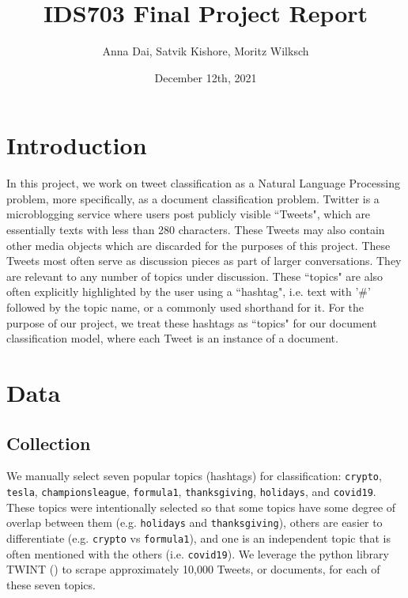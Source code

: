 \documentclass[11pt]{article}
\title{\vspace{-1.5cm}IDS703 Final Project Report}
\author{Anna Dai, Satvik Kishore, Moritz Wilksch}
\date{December 12th, 2021}
\begin{document}
\maketitle

\section{Introduction}

In this project, we work on tweet classification as a Natural Language Processing problem, more specifically, as a document classification problem. Twitter is a microblogging service where users post publicly visible ``Tweets", which are essentially texts with less than 280 characters. These Tweets may also contain other media objects which are discarded for the purposes of this project. These Tweets most often serve as discussion pieces as part of larger conversations. They are relevant to any number of topics under discussion. These ``topics" are also often explicitly highlighted by the user using a ``hashtag", i.e. text with '\#' followed by the topic name, or a commonly used shorthand for it. For the purpose of our project, we treat these hashtags as ``topics" for our document classification model, where each Tweet is an instance of a document.

\section{Data}

\subsection{Collection}
We manually select seven popular topics (hashtags) for classification: \texttt{crypto}, \texttt{tesla}, \texttt{championsleague}, \texttt{formula1}, \texttt{thanksgiving}, \texttt{holidays}, and \texttt{covid19}. These topics were intentionally selected so that some topics have some degree of overlap between them (e.g. \texttt{holidays} and \texttt{thanksgiving}), others are easier to differentiate (e.g. \texttt{crypto} vs \texttt{formula1}), and one is an independent topic that is often mentioned with the others (i.e. \texttt{covid19}). We leverage the python library TWINT (\cite{twint}) to scrape approximately 10,000 Tweets, or documents, for each of these seven topics.
\end{document}
